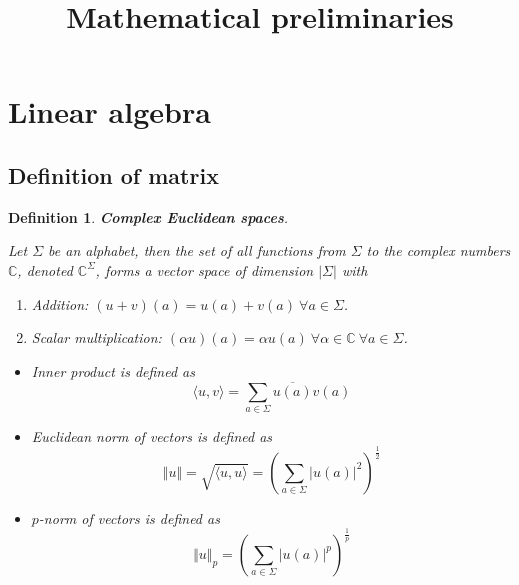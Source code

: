 \documentclass[aps,pra,onecolumn,notitlepage,superscriptaddress]{revtex4-1}
\newcommand{\C}{\mathbb{C}}
\def\>{\rangle}
\def\<{\langle}
\newtheorem{defi}{Definition}
\begin{document}
    \title{Mathematical preliminaries}
    \author{}
    \maketitle

    \section{Linear algebra}

    \subsection{Definition of matrix}
    \begin{defi}
        \textbf{Complex Euclidean spaces}. 
        
        Let $\Sigma$ be an alphabet, then the set of all functions from $\Sigma$ to the complex numbers $\C$, denoted $\C^{\Sigma}$, forms a vector space of dimension $|\Sigma|$ with 
        \begin{enumerate}
            \item Addition: $(u+v)(a) = u(a)+v(a) \ \forall a \in \Sigma$.
            \item Scalar multiplication: $(\alpha u)(a) = \alpha u(a) \ \forall \alpha \in \C \ \forall a \in \Sigma$.
        \end{enumerate}


        \begin{itemize}
            \item Inner product is defined as
            \begin{equation}
                \< u,v \> = \sum_{a \in \Sigma} \overline{u(a)} v(a)
            \end{equation}
    
            \item Euclidean norm of vectors is defined as
            \begin{equation}
                \Vert u \Vert = \sqrt{\<u,u\>} = \left(\sum_{a \in \Sigma} |u(a)|^2 \right)^{\frac{1}{2}}
            \end{equation}
    
            \item $p$-norm of vectors is defined as
            \begin{equation}
                \Vert u \Vert_p = \left(\sum_{a \in \Sigma} |u(a)|^p \right)^{\frac{1}{p}}
            \end{equation}
    

\end{itemize}
\end{defi}
\end{document}
